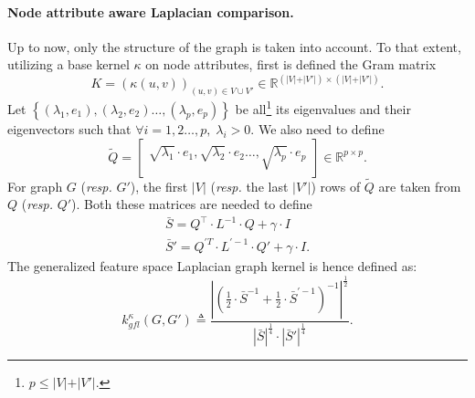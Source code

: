             \paragraph{Node attribute aware Laplacian comparison.}
                Up to now, only the structure of the graph is taken into account.
                To that extent, utilizing a base kernel $\kappa$ on node attributes, first is defined the Gram matrix
                \begin{equation*}
                    K=\left(\kappa\left(u, v\right)\right)_{(u,v) \in V \cup V'} \in \mathbb{R}^{\left(\vert V \vert + \vert V' \vert\right) \times \left(\vert V \vert + \vert V' \vert\right)}.
                \end{equation*}
                Let $\left\{ (\lambda_1, e_1), (\lambda_2, e_2)\dots,(\lambda_p, e_p) \right\}$ be all\footnote{$p \leq \vert V \vert + \vert V' \vert$.} its eigenvalues and their eigenvectors such that $\forall i = 1, 2 \dots, p,\; \lambda_i > 0$.
                We also need to define
                \begin{equation*}
                    \widetilde{Q} = \begin{bmatrix}
                        \sqrt{\lambda_1}\cdot e_1, \sqrt{\lambda_2}\cdot e_2 \dots, \sqrt{\lambda_p}\cdot e_p
                    \end{bmatrix} \in \mathbb{R}^{p \times p}.
                \end{equation*}
                For graph \(G\) (\textit{resp.} \(G'\)), the first $\vert V \vert$ (\textit{resp.} the last $\vert V' \vert$) rows of $\widetilde{Q}$ are taken from $Q$ (\textit{resp.} $Q'$).
                Both these matrices are needed to define 
                \begin{align*}
                    \bar{S} = Q^\intercal\cdot L ^{-1}\cdot Q + \gamma \cdot I\\
                    \bar{S}' = Q^{\prime T}\cdot L^{\prime -1}\cdot Q' + \gamma \cdot I.
                \end{align*}
                The generalized feature space Laplacian graph kernel is hence defined as:
                \begin{equation}
                    \label{eq::generalized_feature_laplacian_kernel}
                    k^{\kappa}_{gfl}(G, G') \triangleq \frac{\left\lvert \left(\frac{1}{2} \cdot \bar{S}^{-1} + \frac{1}{2} \cdot \bar{S}^{\prime -1} \right)^{-1} \right\rvert^{\frac{1}{2}}}{\left\lvert \bar{S}\right\rvert^{\frac{1}{4}}\cdot\left\lvert \bar{S}' \right\rvert^{\frac{1}{4}}}.
                \end{equation}

